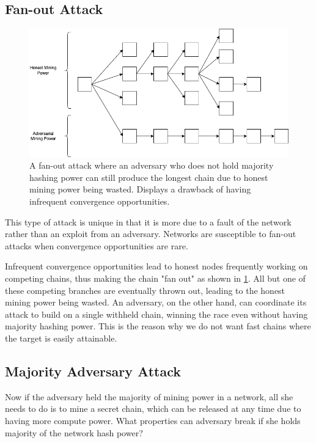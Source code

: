 \subsection{Fan-out Attack}
\begin{figure}
  \includegraphics[width=\linewidth]{figures/fan_out.png}
  \caption{A fan-out attack where an adversary who does not hold majority hashing power can still produce the longest chain due to honest mining power being wasted. Displays a drawback of having infrequent convergence opportunities.}
  \label{fig:fan_out}
\end{figure}

This type of attack is unique in that it is more due to a fault of the network rather than an exploit from an adversary. Networks are susceptible to fan-out attacks when convergence opportunities are rare.

Infrequent convergence opportunities lead to honest nodes frequently working on competing chains, thus making the chain "fan out" as shown in \ref{fig:fan_out}. All but one of these competing branches are eventually thrown out, leading to the honest mining power being wasted. An adversary, on the other hand, can coordinate its attack to build on a single withheld chain, winning the race even without having majority hashing power. This is the reason why we do not want fast chains where the target is easily attainable.

\subsection{Majority Adversary Attack}
Now if the adversary held the majority of mining power in a network, all she needs to do is to mine a secret chain, which can be released at any time due to having more compute power. What properties can adversary break if she holds majority of the network hash power?

